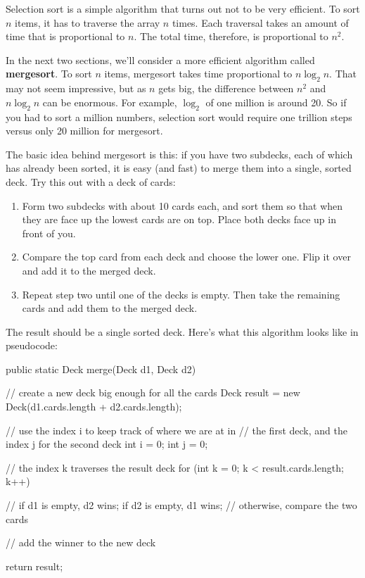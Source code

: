 \documentclass[12pt]{book}
\theoremstyle{exercise}
\begin{document}

Selection sort is a simple algorithm that turns out not to be very efficient.
To sort $n$ items, it has to traverse the array $n$ times.
Each traversal takes an amount of time that is proportional to $n$.
The total time, therefore, is proportional to $n^2$.

In the next two sections, we'll consider a more efficient algorithm called {\bf mergesort}.
To sort $n$ items, mergesort takes time proportional to $n \log_2 n$.
That may not seem impressive, but as $n$ gets big, the difference between $n^2$ and $n \log_2 n$ can be enormous.
For example, $\log_2$ of one million is around 20.
So if you had to sort a million numbers, selection sort would require one trillion steps versus only 20 million for mergesort.

The basic idea behind mergesort is this: if you have two subdecks, each of which has already been sorted, it is easy (and fast) to merge them into a single, sorted deck.
Try this out with a deck of cards:

\begin{enumerate}

\item Form two subdecks with about 10 cards each, and sort them so that when they are face up the lowest cards are on top.
Place both decks face up in front of you.

\item Compare the top card from each deck and choose the lower one.
Flip it over and add it to the merged deck.

\item Repeat step two until one of the decks is empty.
Then take the remaining cards and add them to the merged deck.

\end{enumerate}

The result should be a single sorted deck.
Here's what this algorithm looks like in pseudocode:

\begin{code}
public static Deck merge(Deck d1, Deck d2) {
    // create a new deck big enough for all the cards
    Deck result = new Deck(d1.cards.length + d2.cards.length);

    // use the index i to keep track of where we are at in
    // the first deck, and the index j for the second deck
    int i = 0;
    int j = 0;

    // the index k traverses the result deck
    for (int k = 0; k < result.cards.length; k++) {

        // if d1 is empty, d2 wins; if d2 is empty, d1 wins;
        // otherwise, compare the two cards

        // add the winner to the new deck
    }
    return result;
}
\end{code}
\end{document}
